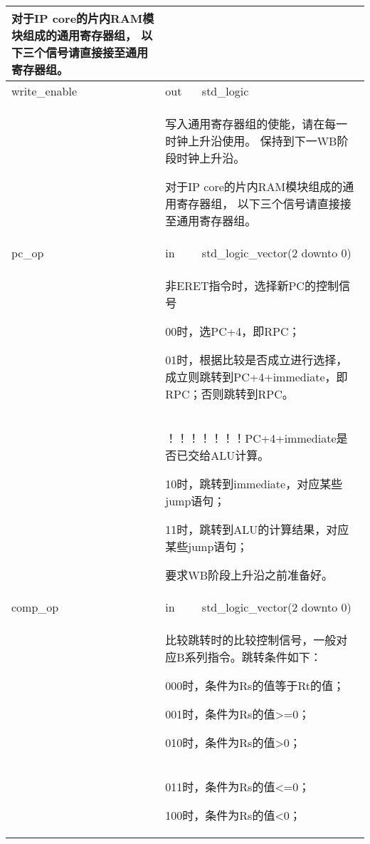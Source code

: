 \begin{tabularx}{\textwidth}{lll}
{                对于IP core的片内RAM模块组成的通用寄存器组，%
                以下三个信号请直接接至通用寄存器组。
            } \\
            \midrule
            write\_enable   & out   & std\_logic \\
            \cmidrule(l){2-3}
            &
            \multicolumn{2}{X}{
                写入通用寄存器组的使能，请在每一时钟上升沿使用。%
                保持到下一WB阶段时钟上升沿。

                对于IP core的片内RAM模块组成的通用寄存器组，%
                以下三个信号请直接接至通用寄存器组。
            } \\
            \midrule
	        pc\_op          & in    & std\_logic\_vector(2 downto 0) \\
            \cmidrule(l){2-3}
            &
            \multicolumn{2}{X}{
                非ERET指令时，选择新PC的控制信号                                             

                    00时，选PC+4，即RPC；                                                    

                    01时，根据比较是否成立进行选择，%
                    成立则跳转到PC+4+immediate，即RPC；否则跳转到RPC。
            } \\
            &
            \multicolumn{2}{X}{
                    ！！！！！！！PC+4+immediate是否已交给ALU计算。

                    10时，跳转到immediate，对应某些jump语句；

                    11时，跳转到ALU的计算结果，对应某些jump语句；

                要求WB阶段上升沿之前准备好。
            } \\
            \midrule
            comp\_op        & in    & std\_logic\_vector(2 downto 0) \\
            \cmidrule(l){2-3}
            &
            \multicolumn{2}{X}{
                比较跳转时的比较控制信号，一般对应B系列指令。跳转条件如下：

                    000时，条件为Rs的值等于Rt的值；

                    001时，条件为Rs的值>=0；

                    010时，条件为Rs的值>0；
            } \\
            &
            \multicolumn{2}{X}{
                    011时，条件为Rs的值<=0；

                    100时，条件为Rs的值<0；

}
\end{tabularx}
